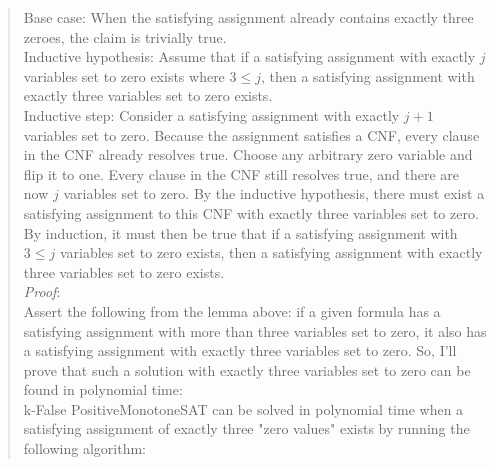 \documentclass[11pt]{article}
\begin{document}
\begin{enumerate}
\begin{enumerate}
\begin{quote}
            Base case: When the satisfying assignment already contains exactly three zeroes, the claim is trivially true. \\

            Inductive hypothesis: Assume that if a satisfying assignment with exactly $j$ variables set to zero exists where $3 \leq j$, then a satisfying assignment with exactly three variables set to zero exists. \\

            Inductive step: Consider a satisfying assignment with exactly $j + 1$ variables set to zero. Because the assignment satisfies a CNF, every clause in the CNF already resolves true. Choose any arbitrary zero variable and flip it to one. Every clause in the CNF still resolves true, and there are now $j$ variables set to zero. By the inductive hypothesis, there must exist a satisfying assignment to this CNF with exactly three variables set to zero. \\

            By induction, it must then be true that if a satisfying assignment with $3 \leq j$ variables set to zero exists, then a satisfying assignment with exactly three variables set to zero exists. \\

            \textit{Proof}: \\

            Assert the following from the lemma above: if a given formula has a satisfying assignment with more than three variables set to zero, it also has a satisfying assignment with exactly three variables set to zero. So, I'll prove that such a solution with exactly three variables set to zero can be found in polynomial time: \\
            
            k-False PositiveMonotoneSAT can be solved in polynomial time when a satisfying assignment of exactly three "zero values" exists by running the following algorithm: \\


\end{quote}
\end{enumerate}
\end{enumerate}
\end{document}
